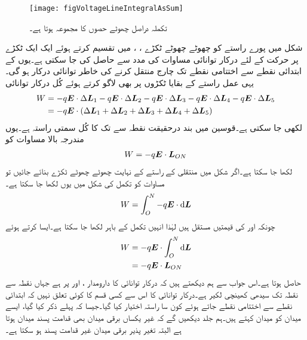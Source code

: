 \begin{figure}
\centering
\texttt{[image: figVoltageLineIntegralAsSum]}
\caption{تکملہ دراصل چھوٹے حصوں کا مجموعہ ہوتا ہے۔}
\label{شکل_دباو_تکملہ_بمع_مجموعہ}
\end{figure}
شکل  میں پورے راستے کو چھوٹے چھوٹے  ٹکڑے ، ،  میں تقسیم  کرتے ہوئے ایک ایک ٹکڑے پر حرکت کے لئے درکار توانائی مساوات  کی مدد سے  حاصل کی جا سکتی ہے۔یوں    کے ابتدائی نقطے سے اختتامی نقطے تک چارج  منتقل کرنے کی
 خاطر  توانائی درکار ہو گی۔یہی عمل راستے کے بقایا ٹکڑوں پر بھی لاگو کرتے ہوئے کُل درکار توانائی
\begin{gather}
\begin{aligned}\label{مساوات_دباو_مجموعہ_ٹکڑے}
W&=-q {{\boldsymbol{E}}} \cdot \Delta {\ensuremath{{\boldsymbol{L}}}}_1 -q {{\boldsymbol{E}}} \cdot \Delta {\ensuremath{{\boldsymbol{L}}}}_2 -q {{\boldsymbol{E}}} \cdot \Delta {\ensuremath{{\boldsymbol{L}}}}_3 -q {{\boldsymbol{E}}} \cdot \Delta {\ensuremath{{\boldsymbol{L}}}}_4 -q {{\boldsymbol{E}}} \cdot \Delta {\ensuremath{{\boldsymbol{L}}}}_5\\
&=-q {{\boldsymbol{E}}} \cdot \left(\Delta {\ensuremath{{\boldsymbol{L}}}}_1  +\Delta {\ensuremath{{\boldsymbol{L}}}}_2 +\Delta {\ensuremath{{\boldsymbol{L}}}}_3+\Delta {\ensuremath{{\boldsymbol{L}}}}_4+\Delta {\ensuremath{{\boldsymbol{L}}}}_5\right)
\end{aligned}
\end{gather}
لکھی جا سکتی ہے۔قوسین میں بند  درحقیقت نقطہ  سے  تک کا  کُل سمتی راستہ  ہے۔یوں مندرجہ بالا مساوات کو
\begin{align}
W=-q {{\boldsymbol{E}}} \cdot {\ensuremath{{\boldsymbol{L}}}}_{ON}
\end{align}
لکھا جا سکتا ہے۔اگر شکل  میں منتقلی کے راستے کے نہایت چھوٹے چھوٹے ٹکڑے  بنائے جائیں تو مساوات  کو تکمل کی شکل میں یوں لکھا جا سکتا ہے۔
\begin{align}
W=\int_O^N -q \kvec{E} \cdot \dif \kvec{L}
\end{align}
چونکہ  اور  کی قیمتیں مستقل ہیں  لہٰذا انہیں تکمل کے باہر لکھا جا سکتا ہے۔ایسا کرتے ہوئے
\begin{gather}
\begin{aligned}\label{مساوات_توانائی_یکساں_میدان_توانائی_راستے_پر_منحصر_نہیں}
W&=-q \kvec{E} \cdot  \int_O^N \dif \kvec{L}\\
&=-q \kvec{E} \cdot \kvec{L}_{ON}
\end{aligned}
\end{gather}
حاصل ہوتا ہے۔اس جواب سے ہم دیکھتے ہیں کہ درکار توانائی کا دارومدار ،  اور  پر ہے جہاں  نقطہ  سے نقطہ  تک سیدھی کھینچی لکیر ہے۔درکار توانائی کا اس سے کسی قسم کا کوئی تعلق نہیں کہ ابتدائی نقطے سے اختتامی نقطے جاتے ہوئے کون سا راستہ اختیار کیا گیا۔جیسا کہ پہلے ذکر کیا گیا، ایسے میدان کو  میدان کہتے ہیں۔ہم جلد دیکھیں گے کہ غیر یکساں برقی میدان بھی قدامت پسند میدان ہوتا ہے البتہ تغیر پذیر  برقی میدان غیر قدامت پسند ہو سکتا ہے۔

